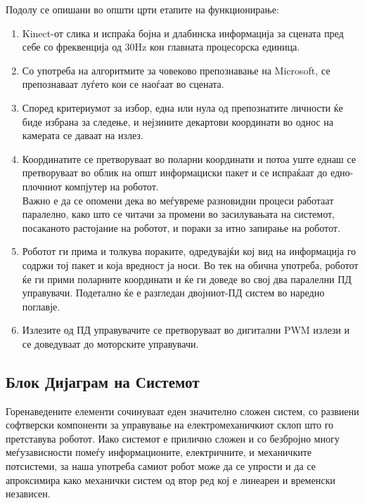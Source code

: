 \documentclass[12pt]{article}
\begin{document}
    Подолу се опишани во општи црти етапите на функционирање:
    \renewcommand{\theenumii}{\arabic{enumii}}
    \renewcommand{\theenumiii}{\arabic{enumiii}}
    \begin{enumerate}
      \item Kinect-от слика и испраќа бојна и длабинска информација за сцената пред себе со фреквенција од 30Hz кон главната процесорска единица.
      \item Со употреба на алгоритмите за човеково препознавање на Microsoft, се препознаваат луѓето кои се наоѓаат во сцената.
      \item Според критериумот за избор, една или нула од препознатите личности ќе биде избрана за следење, и нејзините декартови координати во однос на камерата се даваат на излез.
      \item Координатите се претворуваат во поларни координати и потоа уште еднаш се претворуваат во облик на општ информациски пакет и се испраќаат до едно-плочниот компјутер на роботот.
      \\
      Важно е да се опомени дека во меѓувреме разновидни процеси работаат паралелно, како што се читачи за промени во засилувањата на системот, посаканото растојание на роботот, и пораки за итно запирање на роботот.
      \item Роботот ги прима и толкува пораките, одредувајќи кој вид на информација го содржи тој пакет и која вредност ја носи. Во тек на обична употреба, роботот ќе ги прими поларните координати и ќе ги доведе во свој два паралелни ПД управувачи. Подетално ќе е разгледан двојниот-ПД систем во наредно поглавје.
      \item Излезите од ПД управувачите се претворуваат во дигитални PWM излези и се доведуваат до моторските управувачи.
      \end{enumerate}

  \subsection{Блок Дијаграм на Системот}
    Горенаведените елементи сочинуваат еден значително сложен систем, со развиени софтверски компоненти за управување на електромеханичкиот склоп што го претставува роботот. Иако системот е прилично сложен и со безбројно многу меѓузависности помеѓу информационите, електричните, и механичките потсистеми, за наша употреба самиот робот може да се упрости и да се апроксимира како механички систем од втор ред кој е линеарен и временски независен.\\
\end{document}
